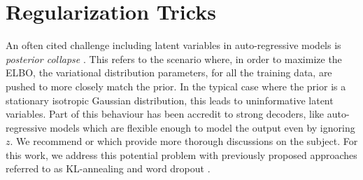 








\section{Regularization Tricks}




An often cited challenge including latent variables in auto-regressive models is  \textit{posterior collapse} \cite{he2018lagging}. This refers to the scenario where, in order to maximize the \ac{ELBO}, the variational distribution parameters, for all the training data, are pushed to more closely match the prior. In the typical case where the prior is a stationary isotropic Gaussian distribution, this leads to uninformative latent variables. Part of this behaviour has been accredit to strong decoders, like auto-regressive models which are flexible enough to model the output even by ignoring $z$. We recommend \citet{chen2016VariationalLossyAE} or \citet{zhao2017InfoVAE} which provide more thorough discussions on the subject. For this work, we address this potential problem with previously proposed approaches referred to as KL-annealing \cite{bowman2015GeneratingSent,sonderby2016LadderVAE} and word dropout \cite{bowman2015GeneratingSent}.

